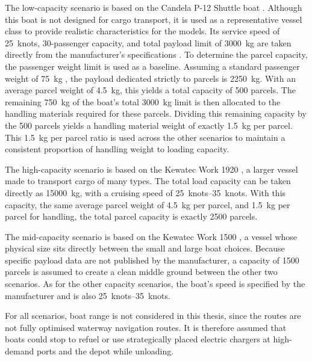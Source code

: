 \documentclass[12pt]{article}
\begin{document}
The low-capacity scenario is based on the Candela P-12 Shuttle boat \parencite{candela2026p12}. Although this boat is not designed for cargo transport, it is used as a representative vessel class to provide realistic characteristics for the models. Its service speed of \qty{25}{knots}, \num{30}-passenger capacity, and total payload limit of \qty{3000}{\kilogram} are taken directly from the manufacturer's specifications \parencite{candela2026p12}. To determine the parcel capacity, the passenger weight limit is used as a baseline. Assuming a standard passenger weight of \qty{75}{\kilogram} \parencite{passengerkg}, the payload dedicated strictly to parcels is \qty{2250}{\kilogram}. With an average parcel weight of \qty{4.5}{\kilogram}, this yields a total capacity of \num{500} parcels. The remaining \qty{750}{\kilogram} of the boat's total \qty{3000}{\kilogram} limit is then allocated to the handling materials required for these parcels. Dividing this remaining capacity by the \num{500} parcels yields a handling material weight of exactly \qty{1.5}{\kilogram} per parcel. This \qty{1.5}{\kilogram} per parcel ratio is used across the other scenarios to maintain a consistent proportion of handling weight to loading capacity.

The high-capacity scenario is based on the Kewatec Work 1920 \parencite{kewatec_work_1920}, a larger vessel made to transport cargo of many types. The total load capacity can be taken directly as \qty{15000}{\kilogram}, with a cruising speed of \qtyrange{25}{35}{knots}. With this capacity, the same average parcel weight of \qty{4.5}{\kilogram} per parcel, and \qty{1.5}{\kilogram} per parcel for handling, the total parcel capacity is exactly \num{2500} parcels.

The mid-capacity scenario is based on the Kewatec Work 1500 \parencite{kewatec_work_1500}, a vessel whose physical size sits directly between the small and large boat choices. Because specific payload data are not published by the manufacturer, a capacity of \num{1500} parcels is assumed to create a clean middle ground between the other two scenarios. As for the other capacity scenarios, the boat's speed is specified by the manufacturer and is also \qtyrange{25}{35}{knots}.

For all scenarios, boat range is not considered in this thesis, since the routes are not fully optimised waterway navigation routes. It is therefore assumed that boats could stop to refuel or use strategically placed electric chargers at high-demand ports and the depot while unloading.
\end{document}
